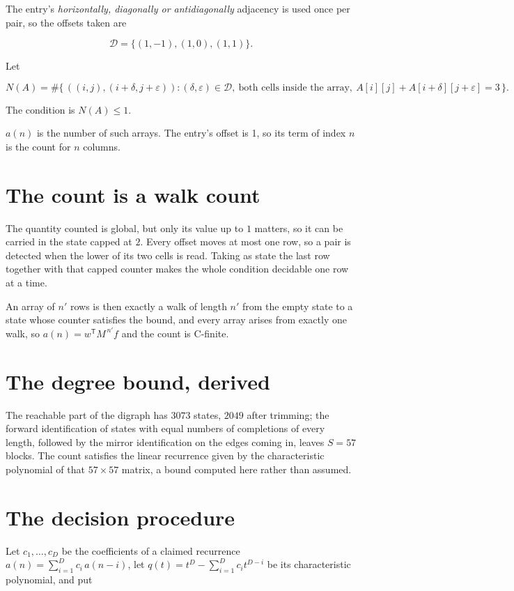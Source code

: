 \documentclass[11pt]{article}
\theoremstyle{definition}
\begin{document}
The entry's {\itshape horizontally, diagonally or antidiagonally} adjacency is used once per pair, so the offsets taken are

\[\mathcal{D} = \{(1,-1), (1,0), (1,1)\}.\]

Let

\[N(A) = \#\bigl\{\,((i,j),(i{+}\delta,j{+}\varepsilon)) : (\delta,\varepsilon) \in \mathcal{D},\ \text{both cells inside the array},\ A[i][j] + A[i{+}\delta][j{+}\varepsilon] = 3\,\bigr\}.\]

The condition is $N(A) \le 1$.

$a(n)$ is the number of such arrays. The entry's offset is 1, so its term of index $n$ is the count for $n$ columns.

\section{The count is a walk count}

The quantity counted is global, but only its value up to $1$ matters, so it can be carried in the state capped at $2$. Every offset moves at most one row, so a pair is detected when the lower of its two cells is read. Taking as state the last row together with that capped counter makes the whole condition decidable one row at a time.

An array of $n'$ rows is then exactly a walk of length $n'$ from the empty state to a state whose counter satisfies the bound, and every array arises from exactly one walk, so $a(n) = w^{\mathsf T}M^{\,n'}f$ and the count is C-finite.

\section{The degree bound, derived}

The reachable part of the digraph has $3073$ states, $2049$ after trimming; the forward identification of states with equal numbers of completions of every length, followed by the mirror identification on the edges coming in, leaves $S = 57$ blocks. The count satisfies the linear recurrence given by the characteristic polynomial of that $57\times57$ matrix, a bound computed here rather than assumed.

\section{The decision procedure}

Let $c_1,\dots,c_D$ be the coefficients of a claimed recurrence $a(n) = \sum_{i=1}^{D} c_i\,a(n-i)$, let $q(t) = t^{D} - \sum_{i=1}^{D} c_i t^{D-i}$ be its characteristic polynomial, and put
\end{document}
